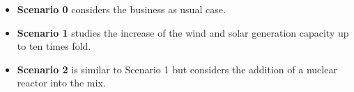 \documentclass{anstrans}
\begin{document}
\begin{itemize}
\item \textbf{Scenario 0} considers the business as usual case.





\item \textbf{Scenario 1} studies the increase of the wind and solar generation capacity up to ten times fold.


\item \textbf{Scenario 2} is similar to Scenario 1 but considers the addition of a nuclear reactor into the mix.


\end{itemize}

\end{document}
